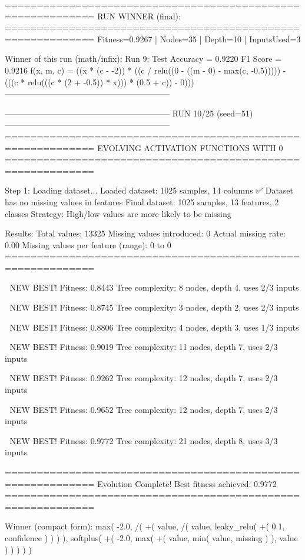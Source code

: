 ============================================================
RUN WINNER (final):
============================================================
Fitness=0.9267 | Nodes=35 | Depth=10 | InputsUsed=3

Winner of this run (math/infix):
  Run 9:
     Test Accuracy = 0.9220
     F1 Score      = 0.9216
     f(x, m, c)    = ((x * (c - -2)) * ((c / relu((0 - ((m - 0) - max(c, -0.5))))) - (((c * relu(((c * (2 + -0.5)) * x))) * (0.5 + c)) - 0)))
------------------------------------------------------------

------------------------------------------------------------
RUN 10/25 (seed=51)
------------------------------------------------------------
============================================================
EVOLVING ACTIVATION FUNCTIONS
WITH 0%
============================================================

Step 1: Loading dataset...
Loaded dataset: 1025 samples, 14 columns
✅ Dataset has no missing values in features
Final dataset: 1025 samples, 13 features, 2 classes
Strategy: High/low values are more likely to be missing

Results:
  Total values: 13325
  Missing values introduced: 0
  Actual missing rate: 0.00%
  Missing values per feature (range): 0 to 0
============================================================


🎯 NEW BEST! Fitness: 0.8443
Tree complexity: 8 nodes, depth 4, uses 2/3 inputs

🎯 NEW BEST! Fitness: 0.8745
Tree complexity: 3 nodes, depth 2, uses 2/3 inputs

🎯 NEW BEST! Fitness: 0.8806
Tree complexity: 4 nodes, depth 3, uses 1/3 inputs

🎯 NEW BEST! Fitness: 0.9019
Tree complexity: 11 nodes, depth 7, uses 2/3 inputs

🎯 NEW BEST! Fitness: 0.9262
Tree complexity: 12 nodes, depth 7, uses 2/3 inputs

🎯 NEW BEST! Fitness: 0.9652
Tree complexity: 12 nodes, depth 7, uses 2/3 inputs

🎯 NEW BEST! Fitness: 0.9772
Tree complexity: 21 nodes, depth 8, uses 3/3 inputs

============================================================
Evolution Complete!
Best fitness achieved: 0.9772
============================================================

Winner (compact form):
 max(
  -2.0,
  /(
    +(
      value,
      /(
        value,
        leaky_relu(
          +(
            0.1,
            confidence
          )
        )
      )
    ),
    softplus(
      +(
        -2.0,
        max(
          +(
            value,
            min(
              value,
              missing
            )
          ),
          value
        )
      )
    )
  )
)

